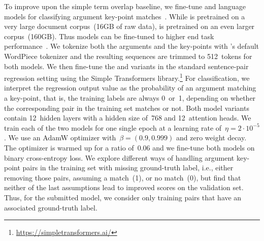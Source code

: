 To improve upon the simple term overlap baseline, we fine-tune \Bert and \Roberta language models for classifying argument key-point matches~\cite{DevlinCLT2019,LiuOGDJCLLZS2019}.
While \Bert is pretrained on a very large document corpus~(16GB of raw data), \Roberta is pretrained on an even larger corpus~(160GB).
Thus \Roberta models can be fine-tuned to higher end task performance~\cite{LiuOGDJCLLZS2019}.
We tokenize both the arguments and the key-points with \Bert's default WordPiece tokenizer and the resulting sequences are trimmed to 512~tokens for both models.
We then fine-tune the \BertBase and \RobertaBase variants in the standard sentence-pair regression setting using the Simple Transformers library.\footnote{\url{https://simpletransformers.ai/}}
For classification, we interpret the regression output value as the probability of an argument matching a key-point, that is, the training labels are always 0~or~1, depending on whether the corresponding pair in the training set matches or not.
Both model variants contain 12~hidden layers with a hidden size of~768 and 12~attention heads.
We train each of the two models for one single epoch at a learning rate of~\( \eta = 2 \cdot 10^{-5} \).
We use an AdamW optimizer with~\( \beta = (0.9, 0.999) \) and zero weight decay.
The optimizer is warmed up for a ratio of~0.06 and we fine-tune both models on binary cross-entropy loss.
We explore different ways of handling argument key-point pairs in the training set with missing ground-truth label, i.e., either removing those pairs, assuming a match~(1), or no match~(0), but find that neither of the last assumptions lead to improved scores on the validation set.
Thus, for the submitted model, we consider only training pairs that have an associated ground-truth label.
